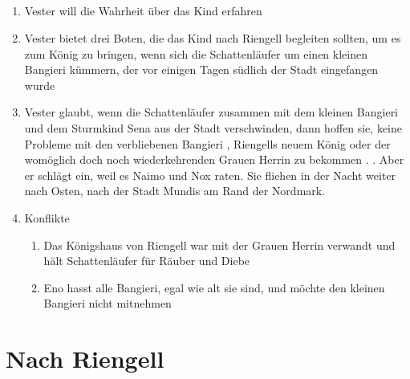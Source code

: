 \documentclass[12pt,a4paper,onecolumn,oneside,ngerman]{book}
\newcommand{\Sena}{Sena}
\newcommand{\Sturmkind}{Sturmkind}
\newcommand{\Bangiri}{Bangieri}
\newcommand{\Schattenlaufer}{Schattenläufer}
\newcommand{\Eno}{Eno}
\newcommand{\Nox}{Nox}
\newcommand{\Lobarn}{Lobarn}
\newcommand{\Vester}{Vester}
\newcommand{\Naimo}{Naimo}
\newcommand{\Nordmark}{Nordmark}
\newcommand{\Rhingell}{Riengell}
\newcommand{\Mundis}{Mundis}
\begin{document}
\chapter[Das Geschäft mit \Lobarn]{}
\begin{enumerate}
  \item {\Vester} will die Wahrheit über das Kind erfahren
  \item {\Vester} bietet drei Boten, die das Kind nach {\Rhingell} begleiten sollten, um es zum König zu bringen, wenn sich die {\Schattenlaufer} um einen kleinen {\Bangiri} kümmern, der vor einigen Tagen südlich der Stadt eingefangen wurde
  \item {\Vester} glaubt, wenn die {\Schattenlaufer} zusammen mit dem kleinen {\Bangiri} und dem {\Sturmkind} {\Sena} aus der Stadt verschwinden, dann hoffen sie, keine Probleme mit den verbliebenen {\Bangiri} , {\Rhingell}s neuem König oder der womöglich doch noch wiederkehrenden Grauen Herrin zu bekommen
.\linebreak
. Aber er schlägt ein, weil es {\Naimo} und {\Nox} raten. Sie fliehen in der Nacht weiter nach Osten, nach der Stadt {\Mundis} am Rand der {\Nordmark}.
  \item Konflikte
  \begin{enumerate}
    \item Das Königshaus von {\Rhingell} war mit der Grauen Herrin verwandt und hält {\Schattenlaufer} für Räuber und Diebe
    \item {\Eno} hasst alle {\Bangiri}, egal wie alt sie sind, und möchte den kleinen {\Bangiri} nicht mitnehmen
  \end{enumerate}  
\end{enumerate}

\part{Nach \Rhingell}
\end{document}
